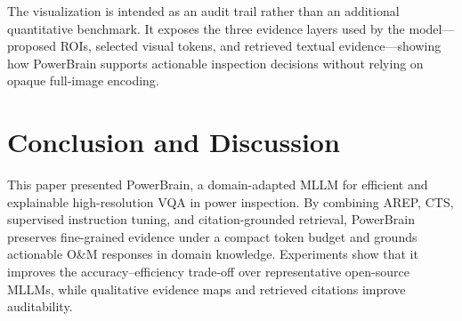 \documentclass[journal,twoside,web]{ieeecolor}
\begin{document}
The visualization is intended as an audit trail rather than an additional quantitative benchmark.
It exposes the three evidence layers used by the model---proposed ROIs, selected visual tokens, and retrieved textual evidence---showing how PowerBrain supports actionable inspection decisions without relying on opaque full-image encoding.

\section{Conclusion and Discussion}
\label{sec:conclusion}

This paper presented PowerBrain, a domain-adapted MLLM for efficient and explainable high-resolution VQA in power inspection. By combining AREP, CTS, supervised instruction tuning, and citation-grounded retrieval, PowerBrain preserves fine-grained evidence under a compact token budget and grounds actionable O\&M responses in domain knowledge. Experiments show that it improves the accuracy--efficiency trade-off over representative open-source MLLMs, while qualitative evidence maps and retrieved citations improve auditability.



\end{document}
